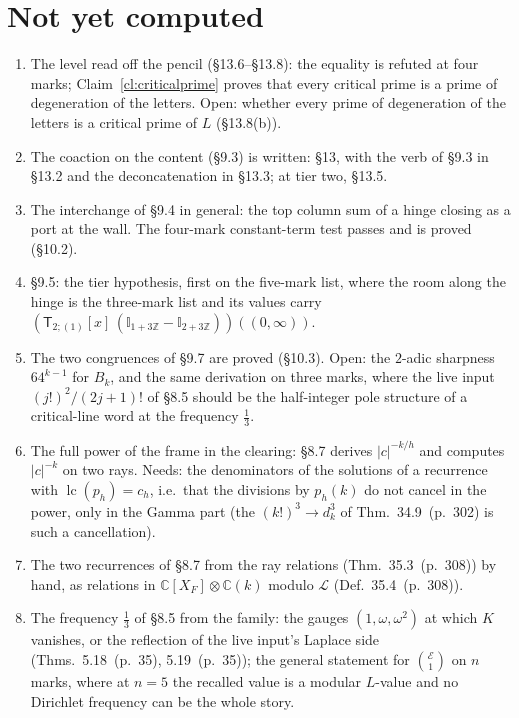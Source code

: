 \documentclass[11pt]{article}
\newcommand{\cE}{\mathcal E}
\newcommand{\sT}{\mathsf T}
\newcommand{\Ilat}[1]{\mathbb I_{#1}}
\newcommand{\Tx}[3]{(\sT_{#1;(1)}[x]\,#2)((#3,\infty))}
\newcommand{\hb}[2]{#1~(p.~#2)}   %
\theoremstyle{plain}
\theoremstyle{remark}
\begin{document}
\section{Not yet computed}

\begin{enumerate}[label=(\arabic*)]
\item The level read off the pencil (\S13.6--\S13.8): the equality is refuted at four marks; Claim~\ref{cl:criticalprime} proves that every critical prime is a prime of degeneration of the letters. Open: whether every prime of degeneration of the letters is a critical prime of $L$ (\S13.8(b)).
\item The coaction on the content (\S9.3) is written: \S13, with the verb of \S9.3 in \S13.2 and the deconcatenation in \S13.3; at tier two, \S13.5.
\item The interchange of \S9.4 in general: the top column sum of a hinge closing as a port at the wall. The four-mark constant-term test passes and is proved (\S10.2).
\item \S9.5: the tier hypothesis, first on the five-mark list, where the room along the hinge is the three-mark list and its values carry $\Tx{2}{(\Ilat{1+3\mathbb Z}-\Ilat{2+3\mathbb Z})}{0}$.
\item The two congruences of \S9.7 are proved (\S10.3). Open: the $2$-adic sharpness $64^{k-1}$ for $B_k$, and the same derivation on three marks, where the live input $(j!)^2/(2j+1)!$ of \S8.5 should be the half-integer pole structure of a critical-line word at the frequency $\frac13$.
\item The full power of the frame in the clearing: \S8.7 derives $|c|^{-k/h}$ and computes $|c|^{-k}$ on two rays. Needs: the denominators of the solutions of a recurrence with $\operatorname{lc}(p_h)=c_h$, i.e.\ that the divisions by $p_h(k)$ do not cancel in the power, only in the Gamma part (the $(k!)^3\to d_k^3$ of Thm.~\hb{34.9}{302} is such a cancellation).
\item The two recurrences of \S8.7 from the ray relations (Thm.~\hb{35.3}{308}) by hand, as relations in $\mathbb C[X_F]\otimes\mathbb C(k)$ modulo $\mathcal L$ (Def.~\hb{35.4}{308}).
\item The frequency $\frac13$ of \S8.5 from the family: the gauges $(1,\omega,\omega^2)$ at which $K$ vanishes, or the reflection of the live input's Laplace side (Thms.~\hb{5.18}{35}, \hb{5.19}{35}); the general statement for $\binom{\cE}1$ on $n$ marks, where at $n=5$ the recalled value is a modular $L$-value and no Dirichlet frequency can be the whole story.

\end{enumerate}
\end{document}
